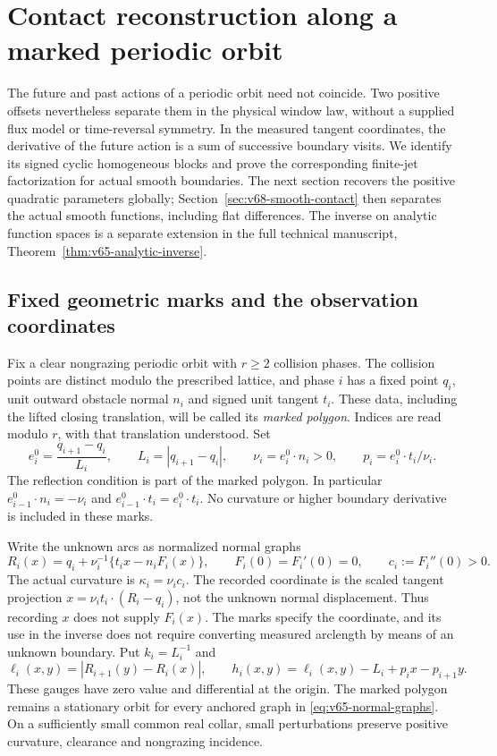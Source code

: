 \section{Contact reconstruction along a marked periodic orbit}
\label{sec:v65-periodic-inverse}

The future and past actions of a periodic orbit need not coincide.
Two positive offsets nevertheless separate them in the physical window
law, without a supplied flux model or time-reversal symmetry.  In the
measured tangent coordinates, the derivative of the future action is a
sum of successive boundary visits.  We identify its signed cyclic
homogeneous blocks and prove the corresponding finite-jet factorization
for actual smooth boundaries.  The next section recovers the positive
quadratic parameters globally; Section~\ref{sec:v68-smooth-contact}
then separates the actual smooth functions, including flat differences.
The inverse on analytic function spaces is a separate extension in the
full technical manuscript, Theorem~\ref{thm:v65-analytic-inverse}.

\subsection{Fixed geometric marks and the observation coordinates}

Fix a clear nongrazing periodic orbit with $r\ge2$ collision phases.
The collision points are distinct modulo the prescribed lattice, and
phase $i$ has a fixed point $q_i$, unit outward obstacle normal $n_i$
and signed unit tangent $t_i$.  These data, including the lifted closing
translation, will be called its \emph{marked polygon}.  Indices are read
modulo $r$, with that translation understood.  Set
\[
 e_i^0=\frac{q_{i+1}-q_i}{L_i},\qquad
 L_i=|q_{i+1}-q_i|,\qquad
 \nu_i=e_i^0\cdot n_i>0,\qquad p_i=e_i^0\cdot t_i/\nu_i.
\]
The reflection condition is part of the marked polygon.  In particular
$e_{i-1}^0\cdot n_i=-\nu_i$ and
$e_{i-1}^0\cdot t_i=e_i^0\cdot t_i$.
No curvature or higher boundary derivative is included in these marks.

Write the unknown arcs as normalized normal graphs
\begin{equation}\label{eq:v65-normal-graphs}
 R_i(x)=q_i+\nu_i^{-1}\{t_i x-n_i F_i(x)\},\qquad
 F_i(0)=F_i'(0)=0,\qquad c_i:=F_i''(0)>0.
\end{equation}
The actual curvature is $\kappa_i=\nu_i c_i$.
The recorded coordinate is the scaled tangent projection
$x=\nu_i t_i\cdot(R_i-q_i)$, not the unknown normal displacement.
Thus recording $x$ does not supply $F_i(x)$.  The marks specify the
coordinate, and its use in the inverse does not require converting
measured arclength by means of an unknown boundary.
Put $k_i=L_i^{-1}$ and
\[
 \ell_i(x,y)=|R_{i+1}(y)-R_i(x)|,\qquad
 h_i(x,y)=\ell_i(x,y)-L_i+p_i x-p_{i+1}y.
\]
These gauges have zero value and differential at the origin.
The marked polygon remains a stationary orbit for every anchored graph
in \eqref{eq:v65-normal-graphs}.  On a sufficiently small common real
collar, small perturbations preserve positive curvature, clearance and
nongrazing incidence.

